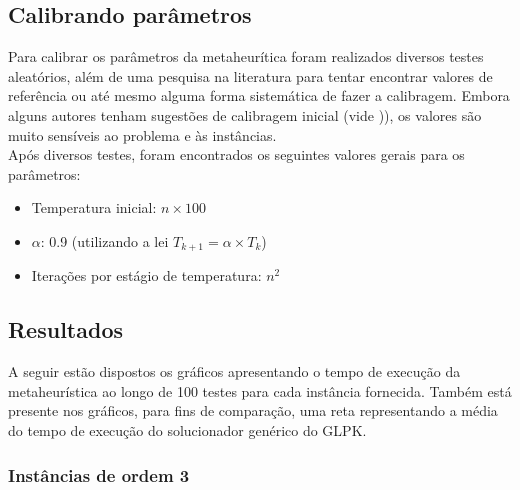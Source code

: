 \documentclass[10pt,a4paper,titlepage]{article}
\begin{document}
	\subsection{Calibrando parâmetros}
	Para calibrar os parâmetros da metaheurítica foram realizados diversos testes aleatórios, além de uma pesquisa na literatura para tentar encontrar valores de referência ou até mesmo alguma forma sistemática de fazer a calibragem. Embora alguns autores tenham sugestões de calibragem inicial (vide \cite[Seção 1.7 (pg 44,45)]{springer})), os valores são muito sensíveis ao problema e às instâncias. \\
	Após diversos testes, foram encontrados os seguintes valores gerais para os parâmetros:
	\begin{itemize}
		\item Temperatura inicial: $n \times 100$
		\item $\alpha$: 0.9 (utilizando a lei $T_{k+1} = \alpha \times T_k$)
		\item Iterações por estágio de temperatura: $n^2$
	\end{itemize}
	
	\subsection{Resultados}
	A seguir estão dispostos os gráficos apresentando o tempo de execução da metaheurística ao longo de 100 testes para cada instância fornecida. Também está presente nos gráficos, para fins de comparação, uma reta representando a média do tempo de execução do solucionador genérico do GLPK.
	
		\subsubsection{Instâncias de ordem 3}
			\paragraph*{}
			

			\paragraph*{}
			

			\paragraph*{}
			
\end{document}
